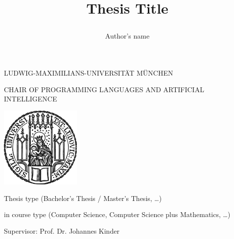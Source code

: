 \documentclass[thesis]{plai}
\title{
    \begin{center}
        \bfseries\LARGE
        Thesis Title
    \end{center}
}
\author{
    \begin{center}
        \large
        Author's name
    \end{center}
}
\date{\relax}
\begin{document}
\begin{center}
    \uppercase{Ludwig-Maximilians-Universität München}
\end{center}

\begin{center}
    \uppercase{Chair of Programming Languages and Artificial Intelligence}
\end{center}

\vspace*{10mm}

\begin{center}
    \includegraphics[height=40mm]{sigillum.png}
\end{center}

\vspace*{10mm}

{\let\newpage\relax\maketitle}

\thispagestyle{empty}

\begin{center}
    \begin{large}
        \begin{Large}
            Thesis type (Bachelor's Thesis / Master's Thesis, \ldots)\\
        \end{Large}
        in course type (Computer Science, Computer Science plus Mathematics, \ldots)\\
    \end{large}
\end{center}

\vspace{1cm}

\begin{center}
    \begin{large}
        Supervisor: Prof. Dr. Johannes Kinder\\
    \end{large}
\end{center}
\end{document}
